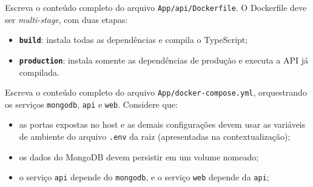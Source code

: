 
\begin{questao}[0,5 ponto]
Escreva o conteúdo completo do arquivo \texttt{App/api/Dockerfile}. O Dockerfile
deve ser \emph{multi-stage}, com duas etapas:

\begin{itemize}
  \item \textbf{\texttt{build}}: instala todas as dependências e compila o
        TypeScript;
  \item \textbf{\texttt{production}}: instala somente as dependências de
        produção e executa a API já compilada.
\end{itemize}

\end{questao}

\begin{questao}[0,5 ponto]
Escreva o conteúdo completo do arquivo \texttt{App/docker-compose.yml},
orquestrando os serviços \texttt{mongodb}, \texttt{api} e \texttt{web}.
Considere que:

\begin{itemize}
  \item as portas expostas no host e as demais configurações devem usar as
        variáveis de ambiente do arquivo \texttt{.env} da raiz
        (apresentadas na contextualização);
  \item os dados do MongoDB devem persistir em um volume nomeado;
  \item o serviço \texttt{api} depende do \texttt{mongodb}, e o serviço
        \texttt{web} depende da \texttt{api};
\end{itemize}

\end{questao}


